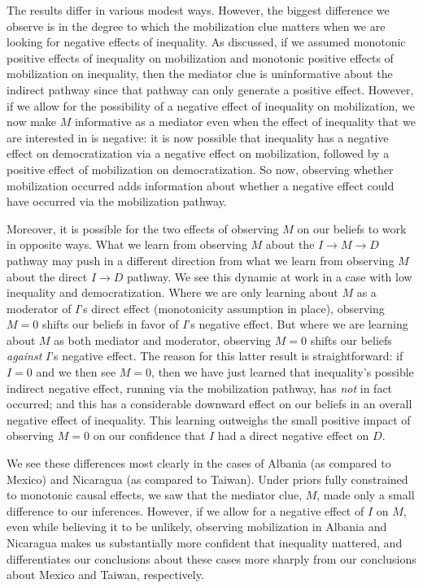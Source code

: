 \documentclass[12pt,]{book}
\begin{document}
The results differ in various modest ways. However, the biggest difference we observe is in the degree to which the mobilization clue matters when we are looking for negative effects of inequality. As discussed, if we assumed monotonic positive effects of inequality on mobilization and monotonic positive effects of mobilization on inequality, then the mediator clue is uninformative about the indirect pathway since that pathway can only generate a positive effect. However, if we allow for the possibility of a negative effect of inequality on mobilization, we now make \(M\) informative as a mediator even when the effect of inequality that we are interested in is negative: it is now possible that inequality has a negative effect on democratization via a negative effect on mobilization, followed by a positive effect of mobilization on democratization. So now, observing whether mobilization occurred adds information about whether a negative effect could have occurred via the mobilization pathway.

Moreover, it is possible for the two effects of observing \(M\) on our beliefs to work in opposite ways. What we learn from observing \(M\) about the \(I \rightarrow M \rightarrow D\) pathway may push in a different direction from what we learn from observing \(M\) about the direct \(I \rightarrow D\) pathway. We see this dynamic at work in a case with low inequality and democratization. Where we are only learning about \(M\) as a moderator of \(I\)'s direct effect (monotonicity assumption in place), observing \(M=0\) shifts our beliefs in favor of \(I\)'s negative effect. But where we are learning about \(M\) as both mediator and moderator, observing \(M=0\) shifts our beliefs \emph{against} \(I\)'s negative effect. The reason for this latter result is straightforward: if \(I=0\) and we then see \(M=0\), then we have just learned that inequality's possible indirect negative effect, running via the mobilization pathway, has \emph{not} in fact occurred; and this has a considerable downward effect on our beliefs in an overall negative effect of inequality. This learning outweighs the small positive impact of observing \(M=0\) on our confidence that \(I\) had a direct negative effect on \(D\).

We see these differences most clearly in the cases of Albania (as compared to Mexico) and Nicaragua (as compared to Taiwan). Under priors fully constrained to monotonic causal effects, we saw that the mediator clue, \(M\), made only a small difference to our inferences. However, if we allow for a negative effect of \(I\) on \(M\), even while believing it to be unlikely, observing mobilization in Albania and Nicaragua makes us substantially more confident that inequality mattered, and differentiates our conclusions about these cases more sharply from our conclusions about Mexico and Taiwan, respectively.
\end{document}
